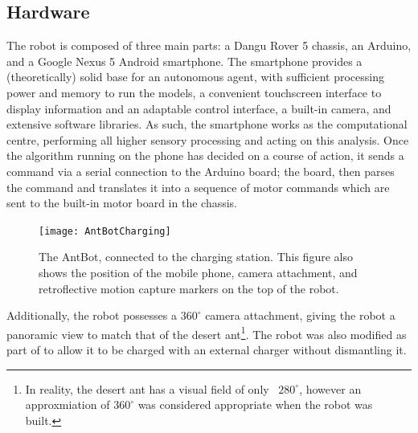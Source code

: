 \documentclass[a4paper,11pt,twoside,openright]{article}
\begin{document}
\subsection{ Hardware }
The robot is composed of three main parts: a Dangu Rover 5 chassis, an Arduino,
and a Google Nexus 5 Android smartphone. The smartphone provides a
(theoretically) solid base for an autonomous agent, with sufficient processing
power and memory to run the models, a convenient touchscreen interface to display
information and an adaptable control interface, a built-in camera, and
extensive software libraries. As such, the smartphone works as the computational
centre, performing all higher sensory processing and acting on this analysis.
Once the algorithm running on the phone has decided on a course of action, it
sends a command via a serial connection to the Arduino board; the board, then
parses the command and translates it into a sequence of motor commands which are
sent to the built-in motor board in the chassis.\newline\par
\begin{figure}[h!]
  \centering
  \texttt{[image: AntBotCharging]}
  \caption{
    \label{fig:antbotcomp} The AntBot, connected to the charging station.
    This figure also shows the position of the mobile phone, camera attachment,
    and retroflective motion capture markers on the top of the robot.
    }
\end{figure}

Additionally, the robot possesses a $360^{\circ}$ camera attachment, giving the
robot a panoramic view to match that of the desert ant\footnote{In reality,
  the desert ant has a visual field of only ~$280^{\circ}$\cite{Ardin2016},
  however an approxmiation of $360^{\circ}$ was considered appropriate when
  the robot was built.}. The robot was also modified as part of
\cite{Mitchell2018} to allow it to be charged with an external charger without
dismantling it.
\end{document}
